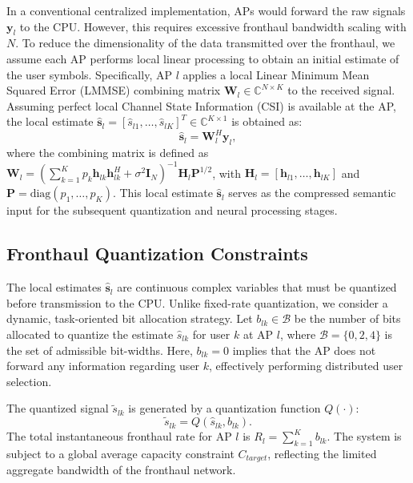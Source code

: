 In a conventional centralized implementation, APs would forward the raw signals $\mathbf{y}_l$ to the CPU. However, this requires excessive fronthaul bandwidth scaling with $N$. To reduce the dimensionality of the data transmitted over the fronthaul, we assume each AP performs local linear processing to obtain an initial estimate of the user symbols. Specifically, AP $l$ applies a local Linear Minimum Mean Squared Error (LMMSE) combining matrix $\mathbf{W}_l \in \mathbb{C}^{N \times K}$ to the received signal. Assuming perfect local Channel State Information (CSI) is available at the AP, the local estimate $\hat{\mathbf{s}}_l = [\hat{s}_{l1}, \dots, \hat{s}_{lK}]^T \in \mathbb{C}^{K \times 1}$ is obtained as:
\begin{equation}
    \hat{\mathbf{s}}_l = \mathbf{W}_l^H \mathbf{y}_l,
\end{equation}
where the combining matrix is defined as $\mathbf{W}_l = \left( \sum_{k=1}^K p_k \mathbf{h}_{lk} \mathbf{h}_{lk}^H + \sigma^2 \mathbf{I}_N \right)^{-1} \mathbf{H}_l \mathbf{P}^{1/2}$, with $\mathbf{H}_l = [\mathbf{h}_{l1}, \dots, \mathbf{h}_{lK}]$ and $\mathbf{P} = \text{diag}(p_1, \dots, p_K)$. This local estimate $\hat{\mathbf{s}}_l$ serves as the compressed semantic input for the subsequent quantization and neural processing stages.

\subsection{Fronthaul Quantization Constraints}
The local estimates $\hat{\mathbf{s}}_l$ are continuous complex variables that must be quantized before transmission to the CPU. Unlike fixed-rate quantization, we consider a dynamic, task-oriented bit allocation strategy. Let $b_{lk} \in \mathcal{B}$ be the number of bits allocated to quantize the estimate $\hat{s}_{lk}$ for user $k$ at AP $l$, where $\mathcal{B} = \{0, 2, 4\}$ is the set of admissible bit-widths. Here, $b_{lk}=0$ implies that the AP does not forward any information regarding user $k$, effectively performing distributed user selection.

The quantized signal $\tilde{s}_{lk}$ is generated by a quantization function $Q(\cdot)$: 
\begin{equation}
    \tilde{s}_{lk} = Q(\hat{s}_{lk}, b_{lk}).
\end{equation}
The total instantaneous fronthaul rate for AP $l$ is $R_l = \sum_{k=1}^K b_{lk}$. The system is subject to a global average capacity constraint $C_{target}$, reflecting the limited aggregate bandwidth of the fronthaul network.

